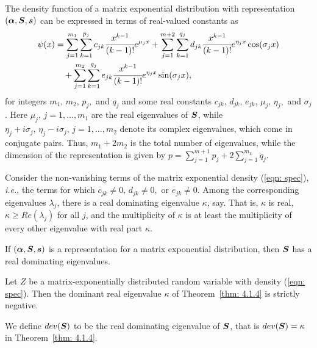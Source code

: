 \begin{thm}
	The density function of a matrix exponential distribution with representation \((\boldsymbol\alpha, \boldsymbol S, \boldsymbol s)\) can be expressed in terms of real-valued constants as 
	\begin{align}
		\psi(x)&=\sum_{j=1}^{m_1} \sum_{k=1}^{p_j} c_{jk} \cfrac{x^{k-1}}{(k-1)!} e^{\mu_jx} + \sum_{j=1}^{m+2}\sum_{k=1}^{q_j} d_{jk}\cfrac{x^{k-1}}{(k-1)!}e^{\eta_jx}\cos(\sigma_jx) \nonumber 
		\\&\quad{}+ \sum_{j=1}^{m_2}\sum_{k=1}^{q_j}e_{jk}\cfrac{x^{k-1}}{(k-1)!}e^{\eta_jx}\sin(\sigma_jx), \label{eqn: spec}
	\end{align}
	for integers \(m_1,\,m_2,\,p_j,\) and \(q_j\) and some real constants \(c_{jk},\,d_{jk},\,e_{jk},\,\mu_j,\,\eta_j,\) and \(\sigma_j\). Here \(\mu_j,\, j=1,\dots,m_1\) are the real eigenvalues of \(\boldsymbol S\), while \(\eta_j+i\sigma_j, \, \eta_j-i\sigma_j,\, j=1,\dots,m_2\) denote its complex eigenvalues, which come in conjugate pairs. Thus, \(m_1+2m_2\) is the total number of eigenvalues, while the dimension of the representation is given by \(\displaystyle p=\sum_{j=1}^{m+1}p_j + 2\sum_{j=1}^{m_2}q_j\). 
\end{thm}
\begin{thm}\label{thm: 4.1.4}
	Consider the non-vanishing terms of the matrix exponential density (\ref{eqn: spec}), \emph{i.e.}, the terms for which \(c_{jk}\neq 0,\,d_{jk}\neq 0,\) or \(e_{jk}\neq 0\). Among the corresponding eigenvalues \(\lambda_j\), there is a real dominating eigenvalue \(\kappa\), say. That is, \(\kappa\) is real, \(\kappa \geq Re(\lambda_j)\) for all \(j\), and the multiplicity of \(\kappa\) is at least the multiplicity of every other eigenvalue with real part \(\kappa\).
\end{thm}
\begin{cor}
If \((\boldsymbol \alpha, \boldsymbol S, \boldsymbol s)\) is a representation for a matrix exponential distribution, then \(\boldsymbol S\) has a real dominating eigenvalues.
\end{cor}
\begin{thm}
	Let \(Z\) be a matrix-exponentially distributed random variable with density (\ref{eqn: spec}). Then the dominant real eigenvalue \(\kappa\) of Theorem~\ref{thm: 4.1.4} is strictly negative. 
\end{thm}
We define \(dev(\boldsymbol S)\) to be the real dominating eigenvalue of \(\boldsymbol S\), that is \(dev(\boldsymbol S)=\kappa\) in Theorem~\ref{thm: 4.1.4}.

